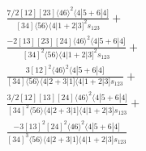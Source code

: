 \documentclass[varwidth, border=5pt]{standalone}
\begin{document}
\begin{my}
$\begin{gathered}
\scriptscriptstyle\frac{7/2[12][23]⟨46⟩^2⟨4|5+6|4]}{[34]⟨56⟩⟨4|1+2|3]^2s_{123}}+\\
\scriptscriptstyle\frac{-2[13][23][24]⟨46⟩^2⟨4|5+6|4]}{[34]^2⟨56⟩⟨4|1+2|3]^2s_{123}}+\\
\scriptscriptstyle\frac{3[12]^2⟨46⟩^2⟨4|5+6|4]}{[34]⟨56⟩⟨4|2+3|1]⟨4|1+2|3]s_{123}}+\\
\scriptscriptstyle\frac{3/2[12][13][24]⟨46⟩^2⟨4|5+6|4]}{[34]^2⟨56⟩⟨4|2+3|1]⟨4|1+2|3]s_{123}}+\\
\scriptscriptstyle\frac{-3[13]^2[24]^2⟨46⟩^2⟨4|5+6|4]}{[34]^3⟨56⟩⟨4|2+3|1]⟨4|1+2|3]s_{123}}\phantom{+}
\end{gathered}$
\end{my}
\end{document}

